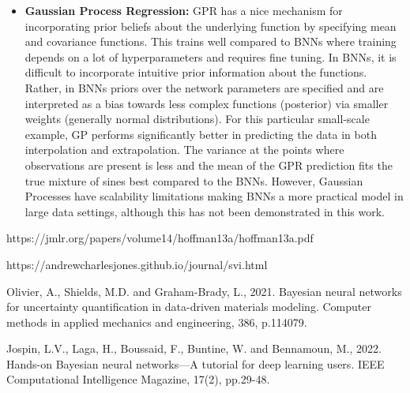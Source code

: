 \documentclass[11pt,a4paper]{article}
\begin{document}
\begin{itemize}
    \item \textbf{Gaussian Process Regression:} GPR has a nice mechanism for incorporating prior beliefs about the underlying function by specifying mean and covariance functions. This trains well compared to BNNs where training depends on a lot of hyperparameters and requires fine tuning. In BNNs, it is difficult to incorporate intuitive prior information about the functions. Rather, in BNNs priors over the network parameters are specified and are interpreted as a bias towards less complex functions (posterior) via smaller weights (generally normal distributions). For this particular small-scale example, GP performs significantly better in predicting the data in  both interpolation and extrapolation. The variance at the points where observations are present is less and the mean of the GPR prediction fits the true mixture of sines best compared to the BNNs. However, Gaussian Processes have scalability limitations making BNNs a more practical model in large data settings, although this has not been demonstrated in this work.
    
\end{itemize}

\begin{thebibliography}{9}
https://jmlr.org/papers/volume14/hoffman13a/hoffman13a.pdf

https://andrewcharlesjones.github.io/journal/svi.html

Olivier, A., Shields, M.D. and Graham-Brady, L., 2021. Bayesian neural networks for uncertainty quantification in data-driven materials modeling. Computer methods in applied mechanics and engineering, 386, p.114079.

Jospin, L.V., Laga, H., Boussaid, F., Buntine, W. and Bennamoun, M., 2022. Hands-on Bayesian neural networks—A tutorial for deep learning users. IEEE Computational Intelligence Magazine, 17(2), pp.29-48.
\end{thebibliography}
\end{document}
